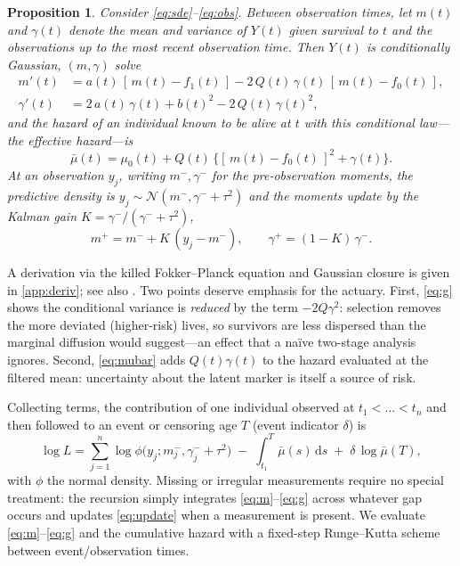 \documentclass[review,3p,times]{elsarticle}
\newtheorem{proposition}{Proposition}
\newcommand{\dd}{\mathrm{d}}
\newcommand{\fzero}{f_0}
\newcommand{\fone}{f_1}
\begin{document}
\begin{proposition}\label{prop:recursion}
Consider \eqref{eq:sde}--\eqref{eq:obs}. Between observation times, let $m(t)$ and
$\gamma(t)$ denote the mean and variance of $Y(t)$ given survival to $t$ and the
observations up to the most recent observation time. Then $Y(t)$ is conditionally
Gaussian, $(m,\gamma)$ solve
\begin{align}
  m'(t)      &= a(t)\,[\,m(t)-\fone(t)\,] - 2\,Q(t)\,\gamma(t)\,[\,m(t)-\fzero(t)\,],
               \label{eq:m}\\
  \gamma'(t) &= 2\,a(t)\,\gamma(t) + b(t)^2 - 2\,Q(t)\,\gamma(t)^2,
               \label{eq:g}
\end{align}
and the hazard of an individual known to be alive at $t$ with this conditional
law---the \emph{effective hazard}---is
\begin{equation}\label{eq:mubar}
  \bar\mu(t) = \mu_0(t) + Q(t)\,\bigl\{[\,m(t)-\fzero(t)\,]^2 + \gamma(t)\bigr\}.
\end{equation}
At an observation $y_j$, writing $m^-,\gamma^-$ for the pre-observation moments,
the predictive density is $y_j\sim\mathcal{N}(m^-,\gamma^-+\tau^2)$ and the moments
update by the Kalman gain $K=\gamma^-/(\gamma^-+\tau^2)$,
\begin{equation}\label{eq:update}
  m^+ = m^- + K\,(y_j-m^-), \qquad \gamma^+ = (1-K)\,\gamma^-.
\end{equation}
\end{proposition}

A derivation via the killed Fokker--Planck equation and Gaussian closure is given
in \ref{app:deriv}; see also \citet{WoodburyManton1977,Yashin2007}. Two points
deserve emphasis for the actuary. First, \eqref{eq:g} shows the conditional
variance is \emph{reduced} by the term $-2Q\gamma^2$: selection removes the more
deviated (higher-risk) lives, so survivors are less dispersed than the marginal
diffusion would suggest---an effect that a na\"ive two-stage analysis ignores.
Second, \eqref{eq:mubar} adds $Q(t)\gamma(t)$ to the hazard evaluated at the
filtered mean: uncertainty about the latent marker is itself a source of risk.

Collecting terms, the contribution of one individual observed at $t_1<\dots<t_n$
and then followed to an event or censoring age $T$ (event indicator $\delta$) is
\begin{equation}\label{eq:loglik}
  \log L = \sum_{j=1}^{n}\log\phi\!\bigl(y_j; m_j^-,\gamma_j^-+\tau^2\bigr)
           \;-\;\int_{t_1}^{T}\bar\mu(s)\,\dd s
           \;+\;\delta\,\log\bar\mu(T),
\end{equation}
with $\phi$ the normal density. Missing or irregular measurements require no
special treatment: the recursion simply integrates \eqref{eq:m}--\eqref{eq:g}
across whatever gap occurs and updates \eqref{eq:update} when a measurement is
present. We evaluate \eqref{eq:m}--\eqref{eq:g} and the cumulative hazard with a
fixed-step Runge--Kutta scheme between event/observation times.
\end{document}
